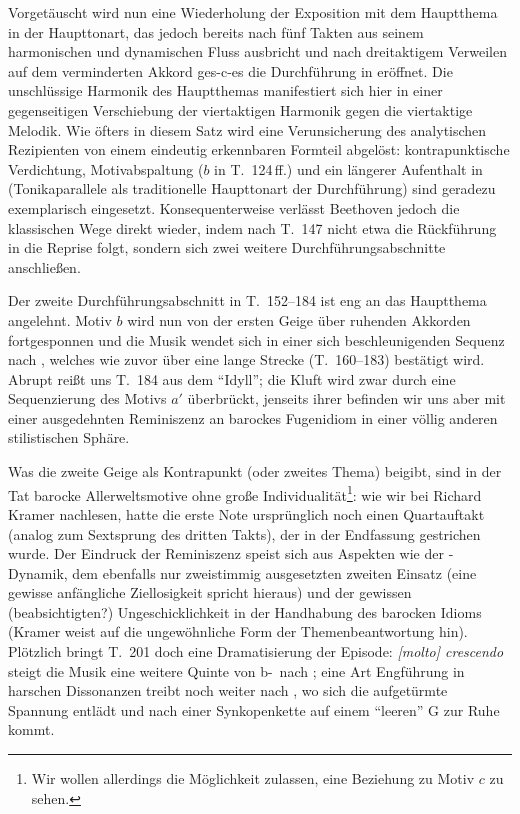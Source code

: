 Vorgetäuscht wird nun eine Wiederholung der Exposition mit dem Hauptthema
in der Haupttonart, das jedoch bereits nach fünf Takten aus seinem
harmonischen und dynamischen Fluss ausbricht und nach dreitaktigem
Verweilen auf dem verminderten Akkord ges-c-es die Durchführung in 
eröffnet.  Die unschlüssige Harmonik des Hauptthemas manifestiert sich
hier in einer gegenseitigen Verschiebung der viertaktigen Harmonik gegen 
die viertaktige Melodik.  Wie öfters in diesem Satz wird eine Verunsicherung
des analytischen Rezipienten von einem eindeutig erkennbaren Formteil
abgelöst: kontrapunktische Verdichtung, Motivabspaltung ($b$ in T.~124\,ff.)
und ein längerer Aufenthalt in  (Tonikaparallele als traditionelle
Haupttonart der Durchführung) sind geradezu exemplarisch
eingesetzt.  Konsequenterweise verlässt Beethoven jedoch die klassischen
Wege direkt wieder, indem nach T.~147 nicht etwa die Rückführung in die
Reprise folgt, sondern sich zwei weitere Durchführungsabschnitte anschließen.

Der zweite Durchführungsabschnitt in T.~152–184 ist eng an das Hauptthema
angelehnt.  Motiv $b$ wird nun von der ersten Geige über ruhenden Akkorden
fortgesponnen und die Musik wendet sich in einer sich beschleunigenden
Sequenz nach , welches wie zuvor  über eine
lange Strecke (T.~160–183) bestätigt wird.  Abrupt reißt uns T.~184 aus dem 
\enquote{Idyll}\cite[S.~150]{indorf}; die Kluft wird zwar durch eine
Sequenzierung des Motivs $a'$ überbrückt, jenseits ihrer befinden wir uns
aber mit einer ausgedehnten Reminiszenz an barockes Fugenidiom in einer
völlig anderen stilistischen Sphäre.

Was die zweite Geige als Kontrapunkt (oder zweites Thema) beigibt, sind
in der Tat barocke Allerweltsmotive ohne große Individualität\footnote{Wir
wollen allerdings die Möglichkeit zulassen, eine Beziehung zu Motiv $c$
zu sehen.}: wie wir bei Richard Kramer\cite[S.~239ff. und 248]{kramer}
nachlesen, hatte die erste Note ursprünglich noch einen Quartauftakt
(analog zum Sextsprung des dritten Takts), der in der Endfassung
gestrichen wurde.  Der Eindruck der Reminiszenz speist sich aus Aspekten
wie der -Dynamik, dem ebenfalls nur zweistimmig ausgesetzten zweiten
Einsatz (eine gewisse anfängliche Ziellosigkeit spricht hieraus) und
der gewissen (beabsichtigten?) Ungeschicklichkeit in der Handhabung
des barocken Idioms (Kramer weist auf die ungewöhnliche Form der
Themenbeantwortung hin).  Plötzlich bringt T.~201 doch eine Dramatisierung
der Episode: \textit{[molto] crescendo} steigt die Musik eine weitere Quinte von
b-~nach ; eine Art Engführung in harschen Dissonanzen treibt noch
weiter nach , wo sich die aufgetürmte Spannung entlädt und nach
einer Synkopenkette auf einem \enquote{leeren} G zur Ruhe kommt.

